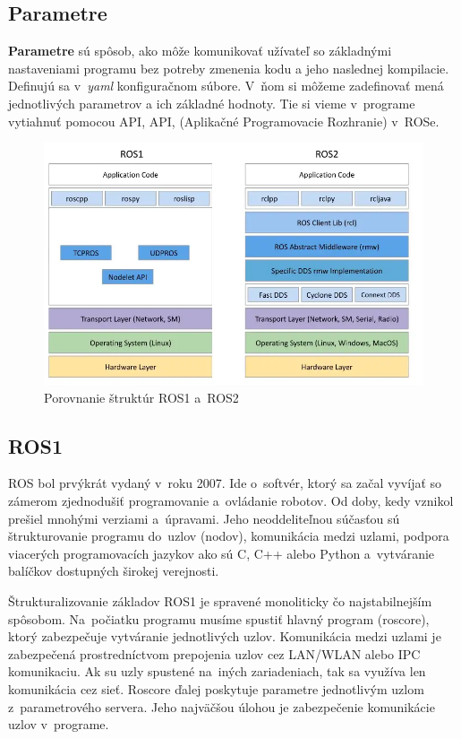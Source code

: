 \subsection{Parametre}

\label{s_parametre}
\textbf{Parametre} sú spôsob, ako môže komunikovať užívateľ so základnými nastaveniami programu bez potreby zmenenia kodu a jeho naslednej kompilacie.
Definujú sa v~\textit{yaml} konfiguračnom súbore. V~ňom si môžeme zadefinovať mená jednotlivých parametrov a ich základné hodnoty. Tie si vieme v~programe
vytiahnuť pomocou API, \acrlong{API}, (Aplikačné Programovacie Rozhranie) v~ROSe.

\begin{figure}[!htbp]
	\centering
	\includegraphics[width=15cm]{img/strukturaRos1Ros2.png}
	\caption{Porovnanie štruktúr ROS1 a~ROS2~\cite{comparison}}
	\label{fig:struktury}
\end{figure}

\subsection{ROS1}

\noindent ROS bol prvýkrát vydaný v~roku 2007. Ide o~softvér, ktorý sa začal vyvíjať so zámerom zjednodušiť programovanie a~ovládanie robotov. Od doby,
kedy vznikol prešiel mnohými verziami a~úpravami. Jeho neoddeliteľnou súčasťou sú štrukturovanie programu do~uzlov (nodov), komunikácia medzi uzlami,
podpora viacerých programovacích jazykov ako sú C, C++ alebo Python a~vytváranie balíčkov dostupných širokej verejnosti.

Štrukturalizovanie základov ROS1 je spravené monoliticky čo najstabilnejším spôsobom. Na~počiatku programu musíme spustiť hlavný program (roscore),
ktorý zabezpečuje vytváranie jednotlivých uzlov. Komunikácia medzi uzlami je zabezpečená prostredníctvom prepojenia uzlov cez LAN/WLAN alebo IPC komunikaciu.
Ak su uzly spustené na~iných zariadeniach, tak sa využíva len komunikácia cez sieť. Roscore ďalej poskytuje parametre jednotlivým uzlom z~parametrového
servera. Jeho najväčšou úlohou je zabezpečenie komunikácie uzlov v~programe.


